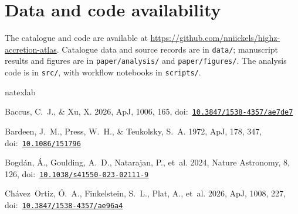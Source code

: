 \documentclass[11pt]{article}
\renewcommand{\bibinfo}[2]{}
\begin{document}
\FloatBarrier
\section{Data and code availability}
\label{app:availability}

The catalogue and code are available at
\url{https://github.com/nniickels/highz-accretion-atlas}.
Catalogue data and source records are in \texttt{data/}; manuscript results
and figures are in \texttt{paper/analysis/} and \texttt{paper/figures/}.
The analysis code is in \texttt{src/}, with workflow notebooks in
\texttt{scripts/}.

\clearpage
\begin{thebibliography}{}
\expandafter\ifx\csname natexlab\endcsname\relax\def\natexlab#1{#1}\fi
\providecommand{\url}[1]{\href{#1}{#1}}
\providecommand{\dodoi}[1]{doi:~\href{http://doi.org/#1}{\nolinkurl{#1}}}
\providecommand{\doeprint}[1]{\href{http://ascl.net/#1}{\nolinkurl{http://ascl.net/#1}}}
\providecommand{\doarXiv}[1]{\href{https://arxiv.org/abs/#1}{\nolinkurl{https://arxiv.org/abs/#1}}}

Baccus, C.~J., \& Xu, X. 2026, \bibinfo{title}{A Comprehensive JWST/NIRSpec
  Census of Broad-line Active Galactic Nuclei: Faint, Low-mass Accretors and a
  Population of Little Red Dots,} ApJ, 1006, 165,
  \dodoi{10.3847/1538-4357/ae7de7}

Bardeen, J.~M., Press, W.~H., \& Teukolsky, S.~A. 1972,
  \bibinfo{title}{Rotating Black Holes: Locally Nonrotating Frames, Energy
  Extraction, and Scalar Synchrotron Radiation,} ApJ, 178, 347,
  \dodoi{10.1086/151796}

Bogd{\'{a}}n, {\'{A}}., Goulding, A.~D., Natarajan, P., {et~al.} 2024,
  \bibinfo{title}{Evidence for heavy-seed origin of early supermassive black
  holes from a z ≈ 10 X-ray quasar,} Nature Astronomy, 8, 126,
  \dodoi{10.1038/s41550-023-02111-9}

Ch{\'{a}}vez~Ortiz, {\'{O}}.~A., Finkelstein, S.~L., Plat, A., {et~al.} 2026,
  \bibinfo{title}{Significant Evidence of an Active Galactic Nucleus
  Contribution in GHZ2 at z = 12.34,} ApJ, 1008, 227,
  \dodoi{10.3847/1538-4357/ae96a4}


\end{thebibliography}
\end{document}
